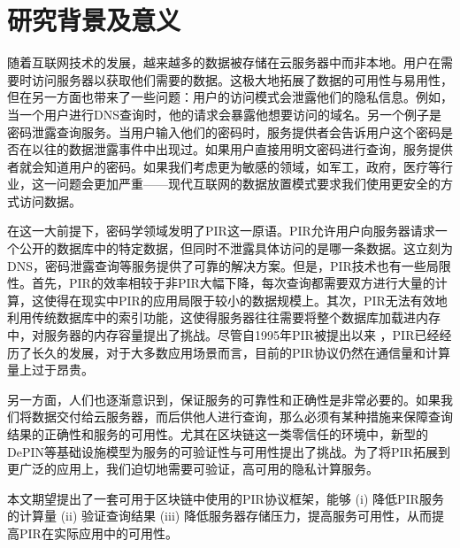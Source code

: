 \section{研究背景及意义}

随着互联网技术的发展，越来越多的数据被存储在云服务器中而非本地。用户在需要时访问服务器以获取他们需要的数据。这极大地拓展了数据的可用性与易用性，但在另一方面也带来了一些问题：用户的访问模式会泄露他们的隐私信息。例如，当一个用户进行DNS查询时，他的请求会暴露他想要访问的域名。另一个例子是密码泄露查询服务。当用户输入他们的密码时，服务提供者会告诉用户这个密码是否在以往的数据泄露事件中出现过。如果用户直接用明文密码进行查询，服务提供者就会知道用户的密码。如果我们考虑更为敏感的领域，如军工，政府，医疗等行业，这一问题会更加严重——现代互联网的数据放置模式要求我们使用更安全的方式访问数据。

在这一大前提下，密码学领域发明了PIR这一原语。PIR允许用户向服务器请求一个公开的数据库中的特定数据，但同时不泄露具体访问的是哪一条数据。这立刻为DNS，密码泄露查询等服务提供了可靠的解决方案。但是，PIR技术也有一些局限性。首先，PIR的效率相较于非PIR大幅下降，每次查询都需要双方进行大量的计算，这使得在现实中PIR的应用局限于较小的数据规模上。其次，PIR无法有效地利用传统数据库中的索引功能，这使得服务器往往需要将整个数据库加载进内存中，对服务器的内存容量提出了挑战。尽管自1995年PIR被提出以来 \cite{FOCS:CGKS95}，PIR已经经历了长久的发展，对于大多数应用场景而言，目前的PIR协议仍然在通信量和计算量上过于昂贵。

另一方面，人们也逐渐意识到，保证服务的可靠性和正确性是非常必要的。如果我们将数据交付给云服务器，而后供他人进行查询，那么必须有某种措施来保障查询结果的正确性和服务的可用性。尤其在区块链这一类零信任的环境中，新型的DePIN等基础设施模型为服务的可验证性与可用性提出了挑战。为了将PIR拓展到更广泛的应用上，我们迫切地需要可验证，高可用的隐私计算服务。

本文期望提出了一套可用于区块链中使用的PIR协议框架，能够 (i) 降低PIR服务的计算量 (ii) 验证查询结果 (iii) 降低服务器存储压力，提高服务可用性，从而提高PIR在实际应用中的可用性。